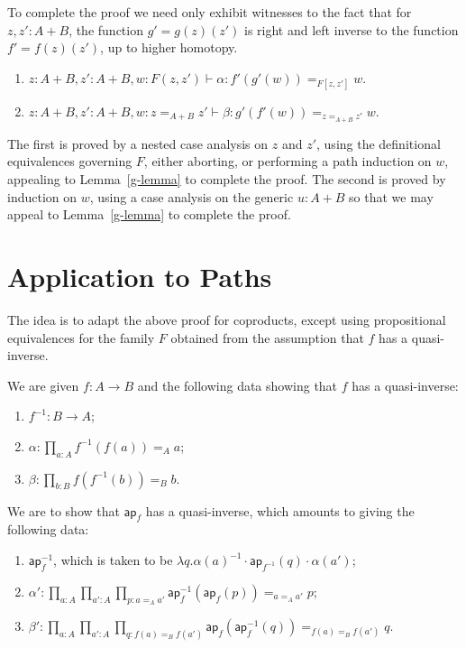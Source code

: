 \documentclass{article}
\newcommand{\sumty}[2]{{#1}+{#2}}
\newcommand{\idty}[3]{{#2}\mathbin{=_{#1}}{#3}}
\newcommand{\prodty}[3]{\prod_{{#1}{:}{#2}}{#3}}
\newcommand{\lam}[2]{\lambda {#1}{.}{#2}}
\newcommand{\app}[2]{{#1}({#2})}
\newcommand{\apppath}[1]{\mathsf{ap}_{#1}}
\newcommand{\inverse}[1]{#1^{-1}}
\newcommand{\concat}[2]{{#1}\cdot{#2}}
\begin{document}
To complete the proof we need only exhibit witnesses to the fact that for $z,z':\sumty{A}{B}$, the function  $g'=\app{\app{g}{z}}{z'}$ is right and left inverse to the function $f'=\app{\app{f}{z}}{z'}$, up to higher homotopy.
\begin{enumerate}
\item $z:\sumty{A}{B},z':\sumty{A}{B},w:F(z,z')\vdash \alpha : \idty{F[z,z']}{\app{f'}{\app{g'}{w}}}{w}$.
\item $z:\sumty{A}{B},z':\sumty{A}{B},w:\idty{\sumty{A}{B}}{z}{z'}\vdash \beta : \idty{\idty{\sumty{A}{B}}{z}{z'}}{\app{g'}{\app{f'}{w}}}{w}$.
\end{enumerate}

The first is proved by a nested case analysis on $z$ and $z'$, using the definitional equivalences governing $F$, either aborting, or performing a path induction on $w$, appealing to Lemma~\ref{g-lemma} to complete the proof.  The second is proved by induction on $w$, using a case analysis on the generic $u:\sumty{A}{B}$ so that we may appeal to Lemma~\ref{g-lemma} to complete the proof.

\section{Application to Paths}

The idea is to adapt the above proof for coproducts, except using propositional equivalences for the family $F$ obtained from the assumption that $f$ has a quasi-inverse.

We are given $f:A\to B$ and the following data showing that $f$ has a quasi-inverse:
\begin{enumerate}
\item $\inverse{f}:B\to A$;
\item $\alpha:\prodty{a}{A}{\idty{A}{\app{\inverse{f}}{\app{f}{a}}}{a}}$;
\item $\beta:\prodty{b}{B}{\idty{B}{\app{f}{\app{\inverse{f}}{b}}}{b}}$.
\end{enumerate}

We are to show that $\apppath{f}$ has a quasi-inverse, which amounts to giving the following data:
\begin{enumerate}
\item $\inverse{\apppath{f}}$, which is taken to be $\lam{q}{\concat{\concat{\inverse{\app{\alpha}{a}}}{\app{\apppath{\inverse{f}}}{q}}}{\app{\alpha}{a'}}}$;
\item $\alpha':\prodty{a}{A}{\prodty{a'}{A}{\prodty{p}{\idty{A}{a}{a'}}{\idty{\idty{A}{a}{a'}}{\app{\inverse{\apppath{f}}}{\app{\apppath{f}}{p}}}{p}}}}$;
\item $\beta':\prodty{a}{A}{\prodty{a'}{A}{\prodty{q}{\idty{B}{\app{f}{a}}{\app{f}{a'}}}{\idty{\idty{B}{\app{f}{a}}{\app{f}{a'}}}{\app{\apppath{f}}{\app{\inverse{\apppath{f}}}{q}}}{q}}}}$.
\end{enumerate}
\end{document}
